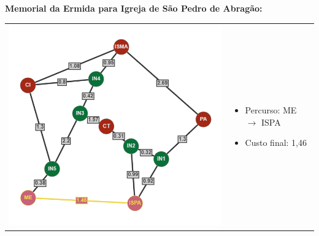 \documentclass[12pt]{article}
\begin{document}
    \noindent \textbf{Memorial da Ermida para Igreja de São Pedro de Abragão:}\\
    \begin{tabular}{@{}m{}m{}@{}}
      \centering\includegraphics[scale=0.4]{anexos/ME-ISPA.png} &
      \begin{itemize}
        \item Percurso: ME $\rightarrow$ ISPA
        \item Custo final: 1,46
      \end{itemize}
    \end{tabular} 
    
\end{document}

